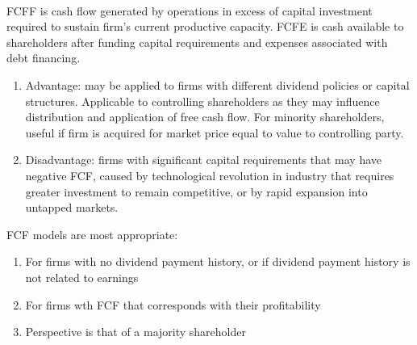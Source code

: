 \begin{definition} \\
FCFF is cash flow generated by operations in excess of capital investment required to sustain firm's current productive capacity. FCFE is cash available to shareholders after funding capital requirements and expenses associated with debt financing.
\begin{enumerate}[label=\roman*.]
\setlength{\itemsep}{0pt}
\item Advantage: may be applied to firms with different dividend policies or capital structures. Applicable to controlling shareholders as they may influence distribution and application of free cash flow. For minority shareholders, useful if firm is acquired for market price equal to value to controlling party.
\item Disadvantage: firms with significant capital requirements that may have negative FCF, caused by technological revolution in industry that requires greater investment to remain competitive, or by rapid expansion into untapped markets.
\end{enumerate}
FCF models are most appropriate:
\begin{enumerate}[label=\roman*.]
\setlength{\itemsep}{0pt}
\item For firms with no dividend payment history, or if dividend payment history is not related to earnings
\item For firms wth FCF that corresponds with their profitability
\item Perspective is that of a majority shareholder
\end{enumerate}
\end{definition}

